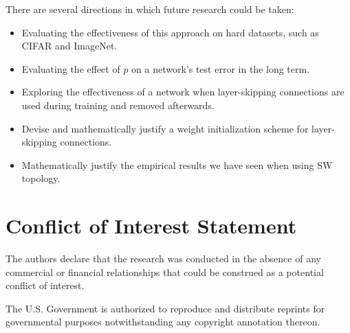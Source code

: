 \documentclass[utf8]{frontiersSCNS}
\begin{document}
There are several directions in which future research could be taken:
\begin{itemize} 
\item Evaluating the effectiveness of this approach on hard datasets, such as CIFAR and ImageNet.
\item Evaluating the effect of $p$ on a network's test error in the long term.
\item Exploring the effectiveness of a network when layer-skipping connections are used during training and removed afterwards.
\item Devise and mathematically justify a weight initialization scheme for layer-skipping connections.
\item Mathematically justify the empirical results we have seen when using SW topology.
\end{itemize}

\section*{Conflict of Interest Statement}

The authors declare that the research was conducted in the absence of any commercial or financial relationships that could be construed as a potential conflict of interest.

The U.S. Government is authorized to reproduce and distribute reprints for governmental purposes notwithstanding any copyright annotation thereon.
%
%
%
%

\end{document}
